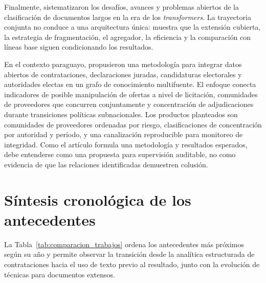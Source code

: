 Finalmente, \textcite{alvaprincipe2025survey} sistematizaron los desafíos, avances y problemas abiertos de la clasificación de documentos largos en la era de los \textit{transformers}. La trayectoria conjunta no conduce a una arquitectura única: muestra que la extensión cubierta, la estrategia de fragmentación, el agregador, la eficiencia y la comparación con líneas base siguen condicionando los resultados.

En el contexto paraguayo, \textcite{cabrera2026graphcollusion} propusieron una metodología para integrar datos abiertos de contrataciones, declaraciones juradas, candidaturas electorales y autoridades electas en un grafo de conocimiento multifuente. El enfoque conecta indicadores de posible manipulación de ofertas a nivel de licitación, comunidades de proveedores que concurren conjuntamente y concentración de adjudicaciones durante transiciones políticas subnacionales. Los productos planteados son comunidades de proveedores ordenadas por riesgo, clasificaciones de concentración por autoridad y período, y una canalización reproducible para monitoreo de integridad. Como el artículo formula una metodología y resultados esperados, debe entenderse como una propuesta para supervisión auditable, no como evidencia de que las relaciones identificadas demuestren colusión.

\section{Síntesis cronológica de los antecedentes}

La Tabla~\ref{tab:comparacion_trabajos} ordena los antecedentes más próximos según su año y permite observar la transición desde la analítica estructurada de contrataciones hacia el uso de texto previo al resultado, junto con la evolución de técnicas para documentos extensos.

